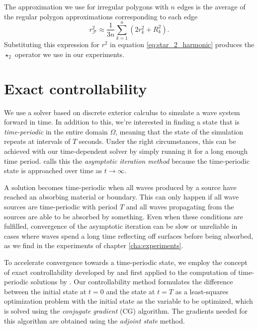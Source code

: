 \documentclass[utf8,english]{gradu3}
\begin{document}
The approximation we use for irregular polygons with $n$ edges is the average
of the regular polygon approximations corresponding to each edge
\begin{equation}\label{eq:polygon_approx_radius}
  r^2_{\mathcal{F}} \approx \frac{1}{3n} \sum_{k=1}^n (2r_k^2 + R_k^2).
\end{equation}
Substituting this expression for $r^2$ in equation \eqref{eq:star_2_harmonic}
produces the $\star_2$ operator we use in our experiments.


\chapter{Exact controllability}\label{cha:controllability}

We use a solver based on discrete exterior calculus to simulate
a wave system forward in time.
In addition to this, we're interested in finding a state that is
\textit{time-periodic} in the entire domain $\Omega$,
meaning that the state of the simulation repeats at intervals of $T$ seconds.
Under the right circumstances, this can be achieved with our time-dependent solver
by simply running it for a long enough time period.
\textcite{rabina_numerical_2014} calls this the \textit{asymptotic iteration method}
because the time-periodic state is approached over time as $t \rightarrow \infty$.

A solution becomes time-periodic when all waves produced by a source
have reached an absorbing material or boundary.
This can only happen if all wave sources are time-periodic with period $T$
and all waves propagating from the sources are able to be absorbed by something.
Even when these conditions are fulfilled,
convergence of the asymptotic iteration can be slow or unreliable in cases
where waves spend a long time reflecting off surfaces before being absorbed,
as we find in the experiments of chapter \ref{cha:experiments}.

To accelerate convergence towards a time-periodic state,
we employ the concept of exact controllability
developed by \textcite{lions_exact_1988}
and first applied to the computation of time-periodic solutions by
\textcite{bristeau_controllability_1998}.
Our controllability method formulates the difference between 
the initial state at $t=0$ and the state at $t=T$
as a least-squares optimization problem
with the initial state as the variable to be optimized,
which is solved using the \textit{conjugate gradient} (CG) algorithm.
The gradients needed for this algorithm are obtained
using the \textit{adjoint state} method.
\end{document}
